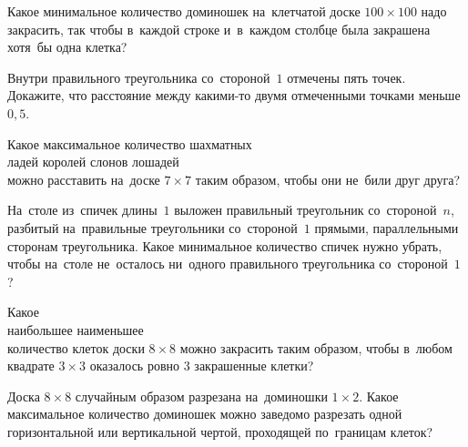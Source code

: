 


\begin{problems}

\item
Какое минимальное количество доминошек на~клетчатой доске $100 \times 100$ надо
закрасить, так чтобы в~каждой строке и~в~каждом столбце была закрашена хотя~бы
одна клетка?

\item
Внутри правильного треугольника со~стороной~$1$ отмечены пять точек.
Докажите, что расстояние между какими-то двумя отмеченными точками меньше
$0{,}5$.

\item
Какое максимальное количество шахматных
\\
\subproblem ладей
\quad
\subproblem королей
\quad
\subproblem слонов
\quad
\subproblem лошадей
\\
можно расставить на~доске $7 \times 7$ таким образом, чтобы они не~били друг
друга?



\item
На~столе из~спичек длины~$1$ выложен правильный треугольник со~стороной~$n$,
разбитый на~правильные треугольники со~стороной~$1$ прямыми, параллельными
сторонам треугольника.
Какое минимальное количество спичек нужно убрать, чтобы на~столе не~осталось
ни~одного правильного треугольника со~стороной~$1$?

\item
Какое
\\
\subproblem наибольшее
\quad
\subproblem наименьшее
\\
количество клеток доски $8 \times 8$ можно закрасить таким образом, чтобы
в~любом квадрате $3 \times 3$ оказалось ровно $3$ закрашенные клетки?

\item
Доска $8 \times 8$ случайным образом разрезана на~доминошки $1 \times 2$.
Какое максимальное количество доминошек можно заведомо разрезать одной
горизонтальной или вертикальной чертой, проходящей по~границам клеток?


\end{problems}
